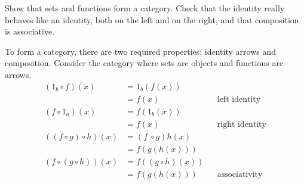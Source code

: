 \begin{ttta}
Show that sets and functions form a category. Check that the identity really
behaves like an identity, both on the left and on the right, and that
composition is associative.
\end{ttta}
To form a category, there are two required properties: identity arrows and
composition. Consider the category where sets are objects and functions are
arrows.
\begin{align*}
    (1_b \circ f)(x)&= 1_b(f(x)) &&\\
               &= f(x) &&\text{left identity}\\
    (f \circ 1_a)(x)&= f(1_b(x)) &&\\
               &= f(x) &&\text{right identity}\\
    \left((f \circ g) \circ h\right)(x) &= (f\ \circ g)h(x) &&\text{}\\
    &= f(g(h(x))) &&\text{}\\
    \left(f \circ (g \circ h)\right)(x) &= f((g\circ h)(x))\\
    &= f(g(h(x)))&&\text{associativity}
\end{align*}
